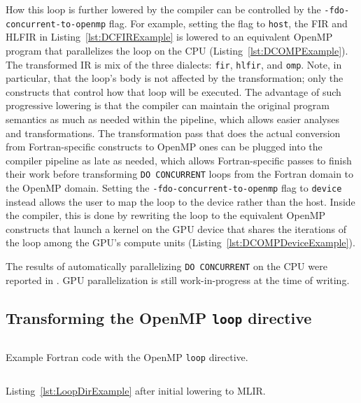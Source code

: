 \documentclass[acmtog,natbib=false]{acmart}
\newcommand{\code}[1]{\texttt{#1}\xspace}
\begin{document}
How this loop is further lowered by the compiler can be controlled by the \code{-fdo-concurrent-to-openmp} flag.
For example, setting the flag to \code{host}, the \ac{FIR} and \ac{HLFIR} in Listing~\ref{lst:DCFIRExample} is lowered to an equivalent OpenMP program that parallelizes the loop on the CPU (Listing~\ref{lst:DCOMPExample}).
The transformed IR is mix of the three dialects: \code{fir}, \code{hlfir}, and \code{omp}.
Note, in particular, that the loop's body is not affected by the transformation; only the constructs that control how that loop will be executed.
The advantage of such progressive lowering is that the compiler can maintain the original program semantics as much as needed within the pipeline, which allows easier analyses and transformations.
The transformation pass that does the actual conversion from Fortran-specific constructs to OpenMP ones can be plugged into the compiler pipeline as late as needed, which allows Fortran-specific passes to finish their work before transforming \code{DO CONCURRENT} loops from the Fortran domain to the OpenMP domain.
Setting the \code{-fdo-concurrent-to-openmp} flag to \code{device} instead allows the user to map the loop to the device rather than the host.
Inside the compiler, this is done by rewriting the loop to the equivalent OpenMP constructs that launch a kernel on the GPU device that shares the iterations of the loop among the GPU's compute units (Listing~\ref{lst:DCOMPDeviceExample}).

The results of automatically parallelizing \code{DO CONCURRENT} on the CPU were reported in \cite{rouson2025automatically}.
GPU parallelization is still work-in-progress at the time of writing.

\subsection{Transforming the OpenMP \code{loop} directive}

\begin{listing}[t]
\inputminted{Fortran}{code/loop_dir_reduction.f90}
\caption{Example Fortran code with the OpenMP \code{loop} directive.}
\label{lst:LoopDirExample}
\end{listing}

\begin{listing}[t]
\inputminted{MLIR-lexer.py:MlirLexer -x}{code/loop_dir_reduction.mlir}
\caption{Listing~\ref{lst:LoopDirExample} after initial lowering to MLIR.}
\label{lst:LoopDirMLIRExample}
\end{listing}
\end{document}
